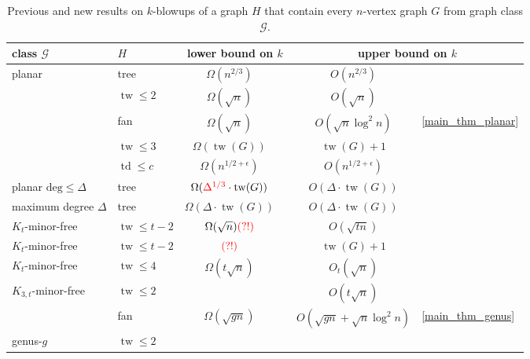 \documentclass{patmorin}
\makeatletter
\renewcommand{\le}{\leqslant}
\renewcommand{\leq}{\leqslant}
\newcommand{\pat}[1]{\textcolor{Blue}{Pat: #1}}
\newcommand{\piotr}[1]{\textcolor{red}{Piotr: #1}}
\def\mathcolor#1#{\@mathcolor{#1}}
\def\@mathcolor#1#2#3{%
  \protect\leavevmode
  \begingroup
    \color#1{#2}#3%
  \endgroup
}
\DeclareMathOperator{\tw}{tw}
\DeclareMathOperator{\td}{td}
\makeatother
\begin{document}
\begin{table}[!ht]
\centering
\caption{
Previous and new results on $k$-blowups of a graph $H$ that contain every $n$-vertex graph $G$ from graph class $\mathcal{G}$.}
\begin{tabular}{llclcl}
\toprule
class $\mathcal{G}$ &$H$
&\multicolumn{2}{c}{lower bound on $k$}
&\multicolumn{2}{c}{upper bound on $k$}\\
  \midrule
\multirow{5}{*}{planar} & tree &
 $\Omega(n^{2/3})$ & \cite{LMST08}
 & $O(n^{2/3})$& \cite{lipton.tarjan:applications}\\[1.5ex]
& $\tw\leq2$
& $\Omega(\sqrt{n})$ &
& $O(\sqrt{n})$ & \cite{distel.dujmovic.ea:product}\\[1.5ex]
& fan
& $\Omega(\sqrt{n})$ &
& $O(\sqrt{n}\log^2 n)$ & \cref{main_thm_planar}\\[1.5ex]
& $\tw\leq3$
& $\Omega(\tw(G))$ &
& $\tw(G)+1$ &  \cite{ISW}\\[1.5ex]
& $\td\leq c$
& $\Omega(n^{1/2+\epsilon})$ & \cite{DvoWoo}
& $O(n^{1/2+\epsilon})$ & \cite{DvoWoo}\\[1ex]
\midrule
   planar $\mathrm{deg}\le \Delta$ & tree
   & $\Omega(\mathcolor{red}{\Delta^{1/3}}\cdot\tw(G))$ & \cite{LMST08}
   & $O(\Delta\cdot\tw(G))$ & \cite{ding.oporowski:some}\\
\midrule
     maximum degree $\Delta$  & tree
     & $\Omega(\Delta\cdot\tw(G))$ & \color{red}{\cite{Wood09}}
     & $O(\Delta\cdot\tw(G))$ & \cite{ding.oporowski:some,Wood09}\\
\midrule
    $K_t$-minor-free & $\tw\leq t-2$
    & $\Omega(\sqrt{n})\mathcolor{red}{(?!)}$ &
    & $O(\sqrt{tn})$ & \cite{ISW}\\[1.5ex]
    $K_t$-minor-free & $\tw\leq t-2$
    & $\mathcolor{red}{(?!)}$ &
    & $\tw(G)+1$ & \cite{ISW}\\[1.5ex]
    $K_t$-minor-free & $\tw\leq4$
    & $\Omega(t\sqrt{n})$ &
    & $O_t(\sqrt{n})$ & \cite{distel.dujmovic.ea:product}\\[1.5ex]
    $K_{3,t}$-minor-free & $\tw\leq 2$
    &&& $O(t\sqrt{n})$ & \cite{distel.dujmovic.ea:product}\\
\midrule
     & fan
     & $\Omega(\sqrt{gn})$ & \cite{DEW17}
     & $O(\sqrt{gn}+\sqrt{n}\log^2 n)$ & \cref{main_thm_genus}\\[1.5ex]
    genus-$g$ & $\tw\leq 2$
    &  &

\end{tabular}
\end{table}
\end{document}
